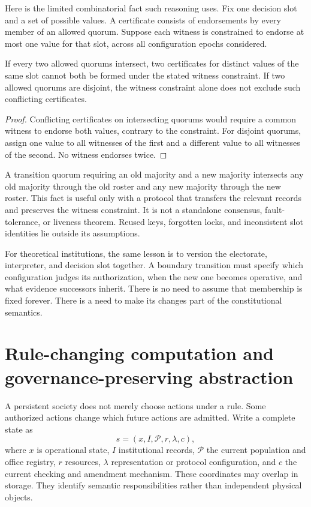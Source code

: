 Here is the limited combinatorial fact such reasoning uses. Fix one decision slot and a set of possible values. A certificate consists of endorsements by every member of an allowed quorum. Suppose each witness is constrained to endorse at most one value for that slot, across all configuration epochs considered.
\begin{MSproposition}\label{MS:prop:handover}
If every two allowed quorums intersect, two certificates for distinct values of the same slot cannot both be formed under the stated witness constraint. If two allowed quorums are disjoint, the witness constraint alone does not exclude such conflicting certificates.
\end{MSproposition}
\begin{proof}
Conflicting certificates on intersecting quorums would require a common witness to endorse both values, contrary to the constraint. For disjoint quorums, assign one value to all witnesses of the first and a different value to all witnesses of the second. No witness endorses twice.
\end{proof}

A transition quorum requiring an old majority and a new majority intersects any old majority through the old roster and any new majority through the new roster. This fact is useful only with a protocol that transfers the relevant records and preserves the witness constraint. It is not a standalone consensus, fault-tolerance, or liveness theorem. Reused keys, forgotten locks, and inconsistent slot identities lie outside its assumptions.

For theoretical institutions, the same lesson is to version the electorate, interpreter, and decision slot together. A boundary transition must specify which configuration judges its authorization, when the new one becomes operative, and what evidence successors inherit. There is no need to assume that membership is fixed forever. There is a need to make its changes part of the constitutional semantics.

\section{Rule-changing computation and governance-preserving abstraction}\label{MS:sec:governance}
A persistent society does not merely choose actions under a rule. Some authorized actions change which future actions are admitted. Write a complete state as
\[
s=(x,I,\mathcal P,r,\lambda,c),
\]
where $x$ is operational state, $I$ institutional records, $\mathcal P$ the current population and office registry, $r$ resources, $\lambda$ representation or protocol configuration, and $c$ the current checking and amendment mechanism. These coordinates may overlap in storage. They identify semantic responsibilities rather than independent physical objects.

